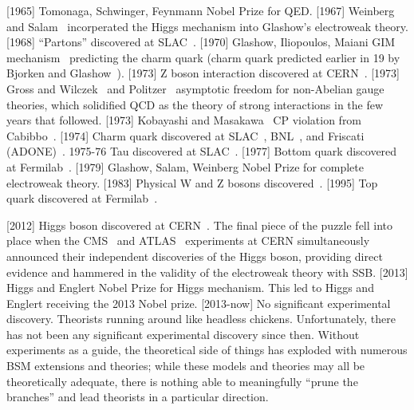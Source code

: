 [1965] Tomonaga, Schwinger, Feynmann Nobel Prize for QED.
[1967] Weinberg~\cite{Weinberg1967Electroweak} and Salam~\cite{Salam1968Electroweak} incorperated the Higgs mechanism into Glashow's electroweak theory.
[1968] ``Partons'' discovered at SLAC~\cite{SLAC1969Partons-1, SLAC1969Partons-2}.
[1970] Glashow, Iliopoulos, Maiani GIM mechanism~\cite{GIM1970GIMMechanism} predicting the charm quark (charm quark predicted earlier in 19 by Bjorken and Glashow~\cite{BjorkenGlashow1964CharmPrediction}).
[1973] Z boson interaction discovered at CERN~\cite{CERN1973ZInteraction-1, CERN1973ZInteraction-2, CERN1973ZInteraction-3}.
[1973] Gross and Wilczek~\cite{GrossWilczek1973AsymptoticFreedom} and Politzer~\cite{Politzer1973AsymptoticFreedom} asymptotic freedom for non-Abelian gauge theories,
which solidified QCD as the theory of strong interactions in the few years that followed.
[1973] Kobayashi and Masakawa~\cite{KobayashiMasakawa1973CKMMatrix} CP violation from Cabibbo~\cite{Cabibbo1963CabbiboMatrix}.
[1974] Charm quark discovered at SLAC~\cite{SLACLBL1974CharmDiscovery}, BNL~\cite{BNLMIT1974CharmDiscovery}, and Friscati (ADONE)~\cite{Frascati1974CharmDiscovery}.
1975-76 Tau discovered at SLAC~\cite{PerlSLAC1975TauEvidence-1, PerlSLAC1976TauEvidence-2, PerlSLAC1977TauDiscovery}.
[1977] Bottom quark discovered at Fermilab~\cite{Fermilab1977BottomQuarkDiscovery}.
[1979] Glashow, Salam, Weinberg Nobel Prize for complete electroweak theory.
[1983] Physical W and Z bosons discovered~\cite{CERN1983WDiscovery-1, CERN1983WDiscovery-2, CERN1983ZDiscovery-1, CERN1983ZDiscovery-2}.
[1995] Top quark discovered at Fermilab~\cite{Fermilab1995TopQuarkDiscovery-1,Fermilab1995TopQuarkDiscovery-2}.

[2012] Higgs boson discovered at CERN~\cite{CMS2012HiggsDiscovery, ATLAS2012HiggsDiscovery}.
The final piece of the puzzle fell into place when the CMS~\cite{CMS2012HiggsDiscovery} and ATLAS~\cite{ATLAS2012HiggsDiscovery} experiments at CERN simultaneously announced their independent discoveries of the Higgs boson,
providing direct evidence and hammered in the validity of the electroweak theory with SSB.
[2013] Higgs and Englert Nobel Prize for Higgs mechanism.
This led to Higgs and Englert receiving the 2013 Nobel prize.
[2013-now] No significant experimental discovery. Theorists running around like headless chickens.
Unfortunately, there has not been any significant experimental discovery since then.
Without experiments as a guide,
the theoretical side of things has exploded with numerous BSM extensions and theories;
while these models and theories may all be theoretically adequate,
there is nothing able to meaningfully ``prune the branches'' and lead theorists in a particular direction.

